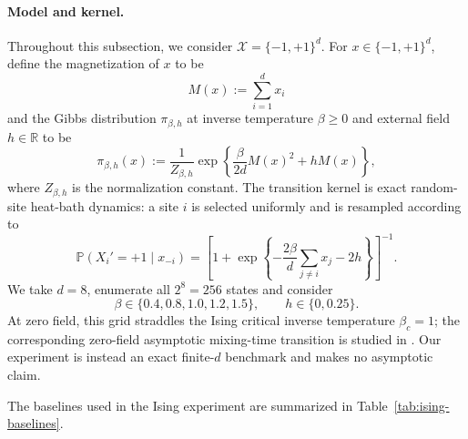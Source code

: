 \documentclass[11pt]{article}
\newcommand{\1}{\mathbf{1}}
\begin{document}
\paragraph{Model and kernel.}
Throughout this subsection, we consider $\mathcal{X} = \{-1,+1\}^d$. For $x\in\{-1,+1\}^d$, define the magnetization of $x$ to be
\[
    M(x):=\sum_{i=1}^d x_i
\]
and the Gibbs distribution $\pi_{\beta,h}$ at inverse temperature $\beta \geq 0$ and external field $h \in \mathbb{R}$ to be
\begin{equation*}
    \pi_{\beta,h}(x)
    :=\frac{1}{Z_{\beta,h}}
      \exp\left\{\frac{\beta}{2d}M(x)^2+hM(x)\right\},
\end{equation*}
where $Z_{\beta,h}$ is the normalization constant. The transition kernel is exact random-site heat-bath dynamics: a site
$i$ is selected uniformly and is resampled according to
\begin{equation*}
    \mathbb P(X_i'=+1\mid x_{-i})
    =\left[
      1+\exp\left\{
        -\frac{2\beta}{d}\sum_{j\ne i}x_j-2h
      \right\}
    \right]^{-1}.
\end{equation*}
We take $d = 8$, enumerate all $2^8=256$ states and consider
\[
    \beta\in\{0.4,0.8,1.0,1.2,1.5\},
    \qquad
    h\in\{0,0.25\}.
\]
At zero field, this grid straddles the Ising critical inverse
temperature $\beta_c=1$; the corresponding zero-field asymptotic
mixing-time transition is studied in \citep{DingLubetzkyPeres2009}.  Our experiment is instead an exact finite-$d$ benchmark and makes no asymptotic claim.

The baselines used in the Ising experiment are summarized
in Table~\ref{tab:ising-baselines}.
\end{document}
